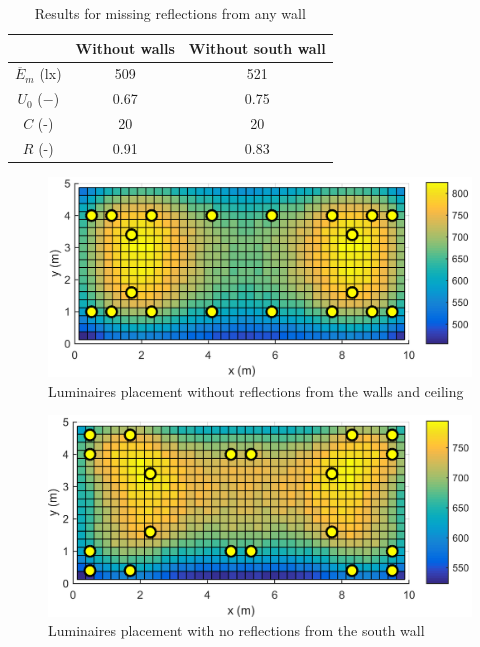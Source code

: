 \begin{table}[tb]
	\renewcommand{\arraystretch}{1.3}
	\caption{Results for missing reflections from any wall}
 	\label{tab:noRef}
	\centering
  \begin{tabular}{| c | c | c |}
    \hline
    & \textbf{Without walls} & \textbf{Without south wall} \\
    \hline
    $\overline{E}_{m}$ (lx) & 509 & 521 \\
    \hline
		$U_0$ ($-$)& 0.67 & 0.75 \\
    \hline
		$C$ (-) & 20 & 20 \\
	\hline
		$R$ (-) & 0.91 & 0.83 \\
  \hline
  \end{tabular}
\end{table}
\begin{figure}[tb]
  \centering
  \includegraphics[width=\columnwidth]{../Vysledky/MSTR_SLB_4x18W_5G4_Fit2_NoRef_V010_S1}
  \caption{Luminaires placement without reflections from the walls and ceiling}
  \label{fig:V010_S1_NoRef}
\end{figure}
\begin{figure}[tb]
  \centering
  \includegraphics[width=\columnwidth]{../Vysledky/MSTR_SLB_4x18W_5G4_Fit2_NoSWall_V010_S1}
  \caption{Luminaires placement with no reflections from the south wall}
  \label{fig:V010_S1_NoSWall}
\end{figure}


